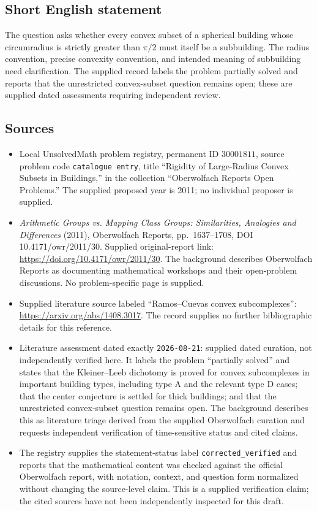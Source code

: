 \documentclass[11pt]{article}
\begin{document}
\subsection{Short English statement}
The question asks whether every convex subset of a spherical building whose circumradius is strictly greater than \(\pi/2\) must itself be a subbuilding. The radius convention, precise convexity convention, and intended meaning of subbuilding need clarification. The supplied record labels the problem partially solved and reports that the unrestricted convex-subset question remains open; these are supplied dated assessments requiring independent review.
\subsection{Sources}
\begin{itemize}
\item Local UnsolvedMath problem registry, permanent ID \(30001811\), source problem code \texttt{catalogue entry}, title ``Rigidity of Large-Radius Convex Subsets in Buildings,'' in the collection ``Oberwolfach Reports Open Problems.'' The supplied proposed year is 2011; no individual proposer is supplied.
\item \emph{Arithmetic Groups vs. Mapping Class Groups: Similarities, Analogies and Differences} (2011), Oberwolfach Reports, pp.\ 1637--1708, DOI 10.4171/owr/2011/30. Supplied original-report link: \url{https://doi.org/10.4171/owr/2011/30}. The background describes Oberwolfach Reports as documenting mathematical workshops and their open-problem discussions. No problem-specific page is supplied.
\item Supplied literature source labeled ``Ramos--Cuevas convex subcomplexes'': \url{https://arxiv.org/abs/1408.3017}. The record supplies no further bibliographic details for this reference.
\item Literature assessment dated exactly \texttt{2026-08-21}: supplied dated curation, not independently verified here. It labels the problem ``partially solved'' and states that the Kleiner--Leeb dichotomy is proved for convex subcomplexes in important building types, including type A and the relevant type D cases; that the center conjecture is settled for thick buildings; and that the unrestricted convex-subset question remains open. The background describes this as literature triage derived from the supplied Oberwolfach curation and requests independent verification of time-sensitive status and cited claims.
\item The registry supplies the statement-status label \texttt{corrected\_verified} and reports that the mathematical content was checked against the official Oberwolfach report, with notation, context, and question form normalized without changing the source-level claim. This is a supplied verification claim; the cited sources have not been independently inspected for this draft.
\end{itemize}
\end{document}
